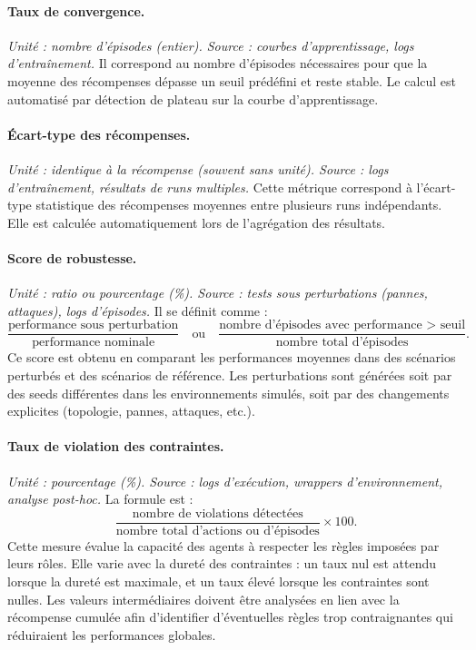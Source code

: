 \paragraph{Taux de convergence.}
\textit{Unité : nombre d’épisodes (entier). Source : courbes d’apprentissage, logs d’entraînement.}
Il correspond au nombre d’épisodes nécessaires pour que la moyenne des récompenses dépasse un seuil prédéfini et reste stable.
Le calcul est automatisé par détection de plateau sur la courbe d’apprentissage.

\paragraph{Écart-type des récompenses.}
\textit{Unité : identique à la récompense (souvent sans unité). Source : logs d’entraînement, résultats de runs multiples.}
Cette métrique correspond à l’écart-type statistique des récompenses moyennes entre plusieurs runs indépendants.
Elle est calculée automatiquement lors de l’agrégation des résultats.

\paragraph{Score de robustesse.}
\textit{Unité : ratio ou pourcentage (\%). Source : tests sous perturbations (pannes, attaques), logs d’épisodes.}
Il se définit comme :
\[
  \frac{\text{performance sous perturbation}}{\text{performance nominale}}
  \quad \text{ou} \quad
  \frac{\text{nombre d’épisodes avec performance > seuil}}{\text{nombre total d’épisodes}}.
\]
Ce score est obtenu en comparant les performances moyennes dans des scénarios perturbés et des scénarios de référence.
Les perturbations sont générées soit par des seeds différentes dans les environnements simulés, soit par des changements explicites (topologie, pannes, attaques, etc.).

\paragraph{Taux de violation des contraintes.}
\textit{Unité : pourcentage (\%). Source : logs d’exécution, wrappers d’environnement, analyse post-hoc.}
La formule est :
\[
  \frac{\text{nombre de violations détectées}}{\text{nombre total d’actions ou d’épisodes}} \times 100.
\]
Cette mesure évalue la capacité des agents à respecter les règles imposées par leurs rôles.
Elle varie avec la dureté des contraintes : un taux nul est attendu lorsque la dureté est maximale, et un taux élevé lorsque les contraintes sont nulles.
Les valeurs intermédiaires doivent être analysées en lien avec la récompense cumulée afin d’identifier d’éventuelles règles trop contraignantes qui réduiraient les performances globales.

